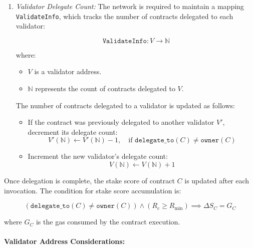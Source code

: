 \documentclass{article}
\begin{document}
\begin{enumerate}
    \item \textit{Validator Delegate Count:} 
    The network is required to maintain a mapping \texttt{ValidateInfo}, which tracks the number of contracts delegated to each validator:

    \begin{equation}
        \texttt{ValidateInfo}: V \to \mathbb{N}
    \end{equation}

    where:
    \begin{itemize}
        \item \( V \) is a validator address.
        \item \( \mathbb{N} \) represents the count of contracts delegated to \( V \).
    \end{itemize} 
    The number of contracts delegated to a validator is updated as follows:
    \begin{itemize}
        \item If the contract was previously delegated to another validator \( V' \), decrement its delegate count:
        \begin{equation}
            V'(\mathbb{N}) \gets V'(\mathbb{N}) - 1, \quad \text{if } \texttt{delegate\_to}(C) \neq \texttt{owner}(C)
        \end{equation}
        \item Increment the new validator's delegate count:
        \begin{equation}
            V(\mathbb{N}) \gets V(\mathbb{N}) + 1
        \end{equation}
    \end{itemize}
\end{enumerate}

Once delegation is complete, the stake score of contract \( C \) is updated after each invocation. The condition for stake score accumulation is:

\begin{equation}
    (\texttt{delegate\_to}(C) \neq \texttt{owner}(C)) \wedge (R_c \geq R_\text{min}) \implies \Delta S_C = G_C
\end{equation}

\noindent where \( G_C \) is the gas consumed by the contract execution.

\paragraph{Validator Address Considerations:}
\end{document}
